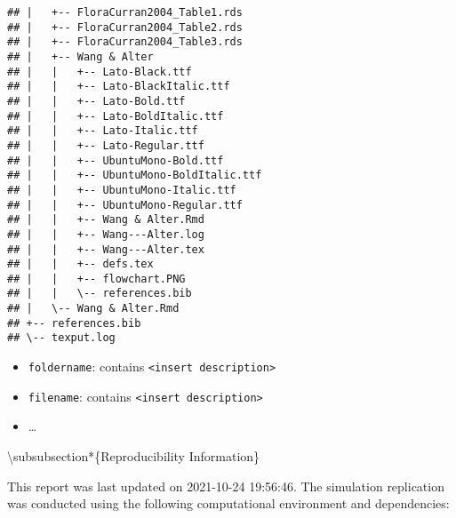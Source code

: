 \documentclass[10,a4paperpaper,]{article}
\begin{document}
\begin{verbatim}
## |   +-- FloraCurran2004_Table1.rds
## |   +-- FloraCurran2004_Table2.rds
## |   +-- FloraCurran2004_Table3.rds
## |   +-- Wang & Alter
## |   |   +-- Lato-Black.ttf
## |   |   +-- Lato-BlackItalic.ttf
## |   |   +-- Lato-Bold.ttf
## |   |   +-- Lato-BoldItalic.ttf
## |   |   +-- Lato-Italic.ttf
## |   |   +-- Lato-Regular.ttf
## |   |   +-- UbuntuMono-Bold.ttf
## |   |   +-- UbuntuMono-BoldItalic.ttf
## |   |   +-- UbuntuMono-Italic.ttf
## |   |   +-- UbuntuMono-Regular.ttf
## |   |   +-- Wang & Alter.Rmd
## |   |   +-- Wang---Alter.log
## |   |   +-- Wang---Alter.tex
## |   |   +-- defs.tex
## |   |   +-- flowchart.PNG
## |   |   \-- references.bib
## |   \-- Wang & Alter.Rmd
## +-- references.bib
## \-- texput.log
\end{verbatim}

\begin{itemize}
\tightlist
\item
  \texttt{foldername}: contains
  \texttt{\textless{}insert\ description\textgreater{}}
\item
  \texttt{filename}: contains
  \texttt{\textless{}insert\ description\textgreater{}}
\item
  \ldots{}
\end{itemize}

\textbackslash subsubsection*\{Reproducibility Information\}

This report was last updated on 2021-10-24 19:56:46. The simulation
replication was conducted using the following computational environment
and dependencies:

\FloatBarrier
\end{document}
